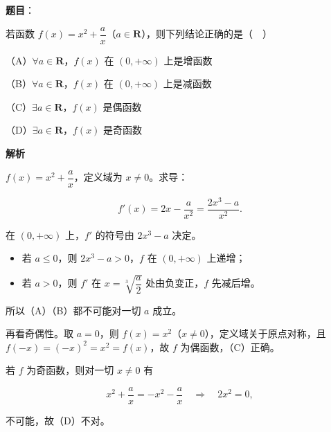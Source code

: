 \begin{answer}

\textbf{题目}：

若函数 $f(x)=x^2+\dfrac ax$（$a\in\mathbf R$），则下列结论正确的是（　）

（A）$\forall a\in\mathbf R$，$f(x)$ 在 $(0,+\infty)$ 上是增函数

（B）$\forall a\in\mathbf R$，$f(x)$ 在 $(0,+\infty)$ 上是减函数

（C）$\exists a\in\mathbf R$，$f(x)$ 是偶函数

（D）$\exists a\in\mathbf R$，$f(x)$ 是奇函数

\textbf{解析}

$f(x)=x^2+\dfrac ax$，定义域为 $x\neq0$。求导：

\nopagebreak[4]
\[f'(x)=2x-\frac{a}{x^2}=\frac{2x^3-a}{x^2}.\]

在 $(0,+\infty)$ 上，$f'$ 的符号由 $2x^3-a$ 决定。

\begin{itemize}
\item 若 $a\leqslant0$，则 $2x^3-a>0$，$f$ 在 $(0,+\infty)$ 上递增；
\item 若 $a>0$，则 $f'$ 在 $x=\sqrt[3]{\dfrac a2}$ 处由负变正，$f$ 先减后增。
\end{itemize}

所以（A）（B）都不可能对一切 $a$ 成立。

再看奇偶性。取 $a=0$，则 $f(x)=x^2$（$x\neq0$），定义域关于原点对称，且 $f(-x)=(-x)^2=x^2=f(x)$，故 $f$ 为偶函数，（C）正确。

若 $f$ 为奇函数，则对一切 $x\neq0$ 有

\nopagebreak[4]
\[x^2+\frac ax=-x^2-\frac ax\quad\Longrightarrow\quad 2x^2=0,\]

不可能，故（D）不对。


\end{answer}
